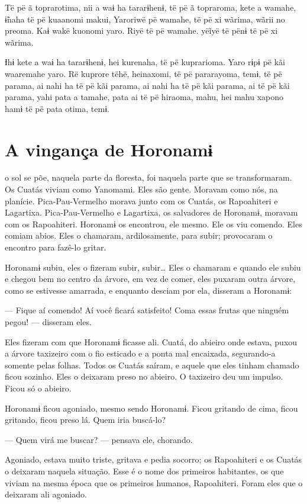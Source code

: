 Të pë ã toprarotima, nii a waɨ ha tararɨhenɨ, të pë ã topraroma, kete a
wamahe, ɨ̃naha të pë kuaanomi makui, Yaroriwë pë wamahe, të pë xi wãrima,
wãrii no preoma. Kaɨ wakë kuonomi yaro. Riyë të pë wamahe. yëĩyë të pënɨ
të pë xi wãrima. 

Ɨhɨ kete a waɨ ha tararɨhenɨ, hei kurenaha, të pë kuprarioma. Yaro rɨpɨ
pë kãi waaremahe yaro. Rë kuprore tëhë, heinaxomi, të pë pararayoma,
temɨ, të pë parama, ai nahi ha të pë kãi parama, ai nahi ha të pë kãi
parama, ai të pë kãi parama, yahi pata a tamahe, pata ai të pë hiraoma,
mahu, hei mahu xapono hamɨ të pë pata otima, temɨ.

\chapter{A vingança de Horonamɨ}
 
 o sol se põe, naquela parte da floresta, foi naquela parte que se
transformaram. Os Cuatás viviam como Yanomami. Eles são gente.
Moravam como nós, na planície. Pica-Pau-Vermelho morava junto com os
Cuatás, os Rapoahiteri e Lagartixa. Pica-Pau-Vermelho e
Lagartixa, os salvadores de Horonamɨ, moravam com os Rapoahiteri.
Horonamɨ os encontrou, ele mesmo. Ele os viu comendo. Eles comiam abios.
Eles o chamaram, ardilosamente, para subir; provocaram o encontro
para fazê-lo gritar.

Horonamɨ subiu, eles o fizeram subir, subir… Eles o chamaram e
quando ele subiu e chegou bem no centro da árvore, em vez de comer, eles
puxaram outra árvore, como se estivesse amarrada, e enquanto desciam por
ela, disseram a Horonamɨ:

--- Fique aí comendo! Aí você ficará satisfeito! Coma essas frutas que
ninguém pegou! --- disseram eles.

Eles fizeram com que Horonamɨ ficasse ali. Cuatá, do abieiro onde
 estava, puxou a árvore taxizeiro com o fio esticado e a ponta mal
 encaixada, segurando-a somente pelas folhas. Todos os Cuatás saíram, e
 aquele que eles tinham chamado ficou sozinho. Eles o deixaram preso no
 abieiro. O taxizeiro deu um impulso. Ficou só o abieiro.

Horonamɨ ficou agoniado, mesmo sendo Horonamɨ. Ficou gritando de cima,
 ficou gritando, ficou preso lá. Quem iria buscá-lo? 

--- Quem virá me buscar? --- pensava ele, chorando. 

Agoniado, estava muito triste, gritava e pedia socorro;
os Rapoahiteri e os Cuatás o deixaram naquela
situação. Esse é o nome dos primeiros habitantes, os que viviam
na mesma época que os primeiros humanos, Rapoahiteri. Foram eles que o
deixaram ali agoniado. 

